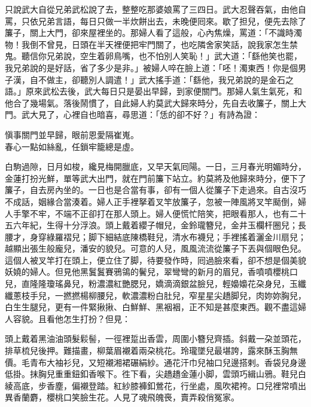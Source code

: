 只說武大自從兄弟武松說了去，整整吃那婆娘罵了三四日。武大忍聲吞氣，由他自罵，只依兄弟言語，每日只做一半炊餅出去，未晚便囘來。歇了担兒，便先去除了簾子，關上大門，卻來屋裡坐的。那婦人看了這般，心內焦燥，罵道：「不識時濁物！我倒不曾見，日頭在半天裡便把牢門關了，也吃隣舍家笑話，說我家怎生禁鬼。聽信你兄弟說，空生着卵鳥嘴，也不怕別人笑恥！」武大道：「繇他笑也罷，{}我兄弟說的是好話，省了多少是非。」被婦人啐在臉上道：「呸！濁東西！你是個男子漢，自不做主，卻聽別人調遣！」武大搖手道：「繇他，我兄弟說的是金石之語。」原來武松去後，武大每日只是晏出早歸，到家便關門。那婦人氣生氣死，和他合了幾場氣。落後鬧慣了，自此婦人約莫武大歸來時分，先自去收簾子，關上大門。武大見了，心裡自也暗喜，尋思道：「恁的卻不好？」有詩為證：

\begin{myquote}
愼事關門並早歸，眼前恩愛隔崔嵬。\\春心一點如絲亂，任鎖牢籠總是虛。
\end{myquote}

白駒過隙，日月如梭，纔見梅開臘底，又早天氣囘陽。一日，三月春光明媚時分，金蓮打扮光鮮，單等武大出門，就在門前簾下站立。約莫將及他歸來時分，便下了簾子，自去房內坐的。一日也是合當有事，卻有一個人從簾子下走過來。自古沒巧不成話，姻緣合當湊着。婦人正手裡拏着叉竿放簾子，忽被一陣風將叉竿颳倒，婦人手擎不牢，不端不正卻打在那人頭上。婦人便慌忙陪笑，把眼看那人，也有二十五六年紀，生得十分浮浪。頭上戴着纓子帽兒，金鈴瓏簪兒，金井玉欄杆圈兒；長腰才，身穿綠羅褶兒；脚下細結底陳橋鞋兒，清水布襪兒；手裡搖着灑金川扇兒；越顯出張生般龐兒，潘安的貌兒。可意的人兒，風風流流從簾子下丟與個眼色兒。這個人被叉竿打在頭上，便立住了脚，待要發作時，囘過臉來看，卻不想是個美貌妖嬈的婦人。{}但見他黑鬒鬒賽鴉鴒的鬢兒，翠彎彎的新月的眉兒，香噴噴櫻桃口兒，直隆隆瓊瑤鼻兒，粉濃濃紅艷腮兒，嬌滴滴銀盆臉兒，輕嬝嬝花朶身兒，玉纖纖蔥枝手兒，一撚撚楊柳腰兒，軟濃濃粉白肚兒，窄星星尖趫脚兒，肉妳妳胸兒，白生生腿兒，更有一件緊揪揪、白鮮鮮、黑裀裀，正不知是甚麼東西。{}觀不盡這婦人容貌。且看他怎生打扮？但見：

\begin{myquote}
頭上戴着黑油油頭髮鬏髻，一徑裡踅出香雲，周圍小簪兒齊插。斜戴一朶並頭花，排草梳兒後押。難描畫，柳葉眉襯着兩朶桃花。玲瓏墜兒最堪誇，露來酥玉胸無價。毛青布大袖衫兒，又短襯湘裙碾絹紗。{}通花汗巾兒袖口兒邊搭剌。香袋兒身邊低掛。抹胸兒重重鈕釦香喉下。徃下看，尖趫趫金蓮小脚，雲頭巧緝山鴉。鞋兒白綾高底，步香塵，偏襯登踏。紅紗膝褲釦鶯花，行坐處，風吹裙袴。口兒裡常噴出異香蘭麝，櫻桃口笑臉生花。人見了魂飛魄䘮，賣弄殺俏冤家。
\end{myquote}

